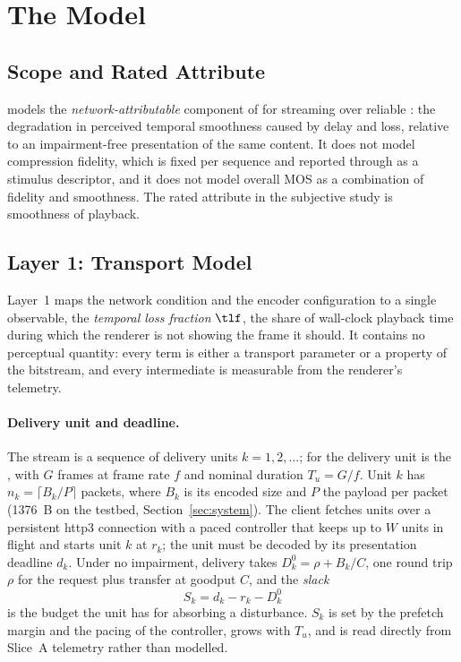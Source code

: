 \section{The \crystal Model}
\label{sec:model}

\subsection{Scope and Rated Attribute}
\label{sec:model-scope}
\crystal models the \emph{network-attributable} component of \qoe for
\vpcc streaming over reliable \quic: the degradation in perceived
temporal smoothness caused by delay and loss, relative to an
impairment-free presentation of the same content. It does not model
compression fidelity, which is fixed per sequence and reported through
\pcqm as a stimulus descriptor, and it does not model overall MOS as a
combination of fidelity and smoothness. The rated attribute in the
subjective study is smoothness of playback.

\subsection{Layer 1: Transport Model}
\label{sec:model-layer1}

Layer~1 maps the network condition and the encoder configuration to a
single observable, the \emph{temporal loss fraction} $\tlf$, the share
of wall-clock playback time during which the renderer is not showing
the frame it should. It contains no perceptual quantity: every term is
either a transport parameter or a property of the bitstream, and every
intermediate is measurable from the renderer's telemetry.

\paragraph{Delivery unit and deadline.}
The stream is a sequence of delivery units $k = 1, 2, \ldots$; for
\vpcc the delivery unit is the \gof, with $G$ frames at frame rate $f$
and nominal duration $T_u = G/f$. Unit $k$ has $n_k = \lceil B_k / P
\rceil$ packets, where $B_k$ is its encoded size and $P$ the payload per
\quic packet (\SI{1376}{B} on the testbed, Section~\ref{sec:system}).
The client fetches units over a persistent \gls{http3} connection with
a paced controller that keeps up to $W$ units in flight and starts
unit $k$ at $r_k$; the unit must be decoded by its presentation
deadline $d_k$. Under no impairment, delivery takes $D^0_k = \rho +
B_k/C$, one round trip $\rho$ for the request plus transfer at goodput
$C$, and the \emph{slack}
\begin{equation}
  S_k = d_k - r_k - D^0_k
  \label{eq:slack}
\end{equation}
is the budget the unit has for absorbing a disturbance. $S_k$ is set by
the prefetch margin and the pacing of the controller, grows with $T_u$,
and is read directly from Slice~A telemetry rather than modelled.

